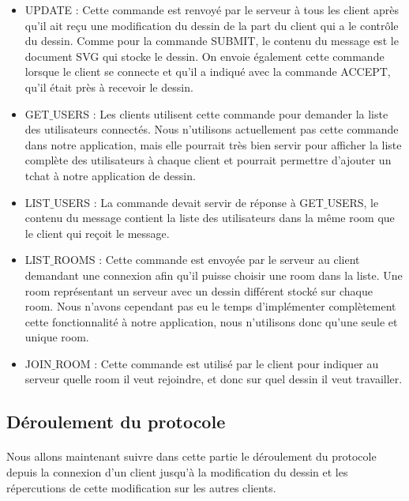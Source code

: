 \documentclass[a4paper,11pt]{article}
\begin{document}
\begin{itemize}
\item UPDATE : Cette commande est renvoyé par le serveur à tous les client après qu'il ait reçu une modification du dessin de la part du client qui a le contrôle du dessin. Comme pour la commande SUBMIT, le contenu du message est le document SVG qui stocke le dessin.
On envoie également cette commande lorsque le client se connecte et qu'il a indiqué avec la commande ACCEPT, qu'il était près à recevoir le dessin.

\item GET$\_$USERS : Les clients utilisent cette commande pour demander la liste des utilisateurs connectés. Nous n'utilisons actuellement pas cette commande dans notre application, mais elle pourrait très bien servir pour afficher la liste complète des utilisateurs à chaque client et pourrait permettre d'ajouter un tchat à notre application de dessin.

\item LIST$\_$USERS : La commande devait servir de réponse à GET$\_$USERS, le contenu du message contient la liste des utilisateurs dans la même room que le client qui reçoit le message.

\item LIST$\_$ROOMS : Cette commande est envoyée par le serveur au client demandant une connexion afin qu'il puisse choisir une room dans la liste. Une room représentant un serveur avec un dessin différent stocké sur chaque room.
Nous n'avons cependant pas eu le temps d'implémenter complètement cette fonctionnalité à notre application, nous n'utilisons donc qu'une seule et unique room.

\item JOIN$\_$ROOM : Cette commande est utilisé par le client pour indiquer au serveur quelle room il veut rejoindre, et donc sur quel dessin il veut travailler.
\end{itemize}

\subsection{Déroulement du protocole}
\paragraph{}Nous allons maintenant suivre dans cette partie le déroulement du protocole depuis la connexion d'un client jusqu'à la modification du dessin et les répercutions de cette modification sur les autres clients.
\end{document}
